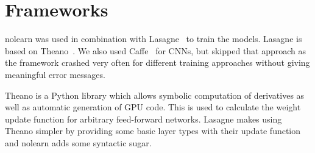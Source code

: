 
\section{Frameworks}\label{sec:frameworks}
nolearn was used in combination with Lasagne~\cite{sander_dieleman_2015_27878}
to train the models. Lasagne is based on Theano~\cite{Bergstra2010}. We also
used Caffe~\cite{Jia2014} for \glspl{CNN}, but skipped that approach as the
framework crashed very often for different training approaches without giving
meaningful error messages.

Theano is a Python library which allows symbolic computation of derivatives as
well as automatic generation of GPU code. This is used to calculate the weight
update function for arbitrary feed-forward networks. Lasagne makes using Theano
simpler by providing some basic layer types with their update function and
nolearn adds some syntactic sugar.
